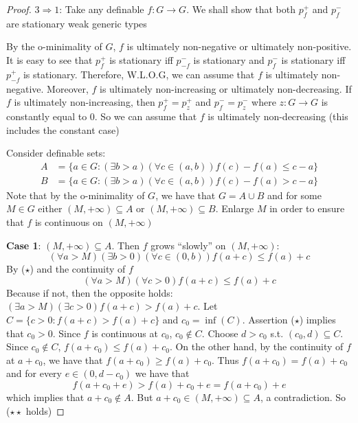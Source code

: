 \documentclass[11pt]{article}
\begin{document}
\begin{proof}
\(3\Rightarrow 1\): Take any definable \(f:G\to G\). We shall show that both \(p_f^+\) and \(p_f^-\) are
stationary weak generic types

By the o-minimality of \(G\), \(f\) is ultimately non-negative or ultimately non-positive. It is
easy to see that \(p_f^+\) is stationary iff \(p_{-f}^-\) is stationary and \(p_f^-\) is stationary
iff \(p_{-f}^+\) is stationary. Therefore, W.L.O.G, we can assume that \(f\) is ultimately
non-negative. Moreover, \(f\) is ultimately non-increasing or ultimately non-decreasing.
If \(f\) is ultimately non-increasing, then \(p_f^+=p_z^+\) and \(p_f^-=p_z^-\) where \(z:G\to G\) is
constantly equal to 0.
So we can assume that \(f\) is ultimately non-decreasing (this includes the constant case)

Consider definable sets:
\begin{align*}
A&=\{a\in G:(\exists b>a)(\forall c\in(a,b))f(c)-f(a)\le c-a\}\\
B&=\{a\in G:(\exists b>a)(\forall c\in(a,b))f(c)-f(a)>c-a\}
\end{align*}
Note that by the o-minimality of \(G\), we have that \(G=A\cup B\) and for some \(M\in G\)
either \((M,+\infty)\subseteq A\) or \((M,+\infty)\subseteq B\). Enlarge \(M\) in order to ensure that \(f\) is continuous
on \((M,+\infty)\)

\textbf{Case 1}: \((M,+\infty)\subseteq A\). Then \(f\) grows ``slowly'' on \((M,+\infty)\):
\begin{equation*}
(\forall a>M)(\exists b>0)(\forall c\in(0,b))f(a+c)\le f(a)+c\tag{\star}
\end{equation*}
By (\(\star\)) and the continuity of \(f\)
\begin{equation*}
(\forall a>M)(\forall c>0)f(a+c)\le f(a)+c\tag{\star\star}
\end{equation*}
Because if not, then the opposite holds: \((\exists a>M)(\exists c>0)f(a+c)>f(a)+c\).
Let \(C=\{c>0:f(a+c)>f(a)+c\}\) and \(c_0=\inf(C)\).
Assertion (\(\star\)) implies that \(c_0>0\). Since \(f\) is continuous at \(c_0\), \(c_0\notin C\).
Choose \(d>c_0\) s.t. \((c_0,d)\subseteq C\). Since \(c_0\notin C\), \(f(a+c_0)\le f(a)+c_0\). On the other
hand, by the continuity of \(f\) at \(a+c_0\), we have that \(f(a+c_0)\ge f(a)+c_0\).
Thus \(f(a+c_0)=f(a)+c_0\) and for every \(e\in(0,d-c_0)\) we have that
\begin{equation*}
f(a+c_0+e)>f(a)+c_0+e=f(a+c_0)+e
\end{equation*}
which implies that \(a+c_0\notin A\). But \(a+c_0\in(M,+\infty)\subseteq A\), a contradiction. So (\(\star\star\) holds)


\end{proof}
\end{document}
